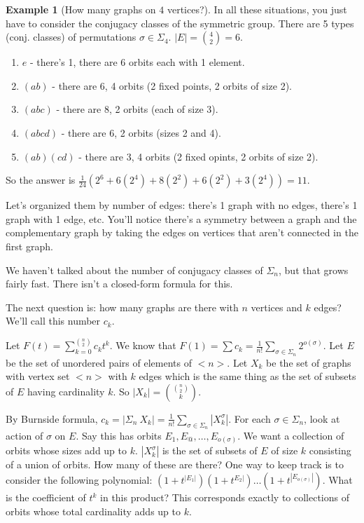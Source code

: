 \documentclass[12pt]{article}
\theoremstyle{definition}
\newtheorem{exmp}{Example}[section]
\begin{document}
\begin{exmp}[How many graphs on $4$ vertices?]
    In all these situations, you just have to consider the conjugacy classes of
    the symmetric group. There are 5 types (conj. classes) of permutations
    $\sigma \in \Sigma_4$. $|E| = {4 \choose 2} = 6$.
    \begin{enumerate}
        \item $e$ - there's 1, there are 6 orbits each with 1 element.
        \item $(ab)$ - there are 6, 4 orbits (2 fixed points, 2 orbits of size 2).
        \item $(abc)$ - there are 8, 2 orbits (each of size 3).
        \item $(abcd)$ - there are 6, 2 orbits (sizes 2 and 4).
        \item $(ab)(cd)$ - there are 3, 4 orbits (2 fixed opints, 2 orbits of size 2).
    \end{enumerate}
    So the answer is $\frac{1}{24} (2^6 + 6(2^4) + 8(2^2) + 6(2^2) + 3(2^4)) =
    11$.

    Let's organized them by number of edges: there's 1 graph with no edges,
    there's 1 graph with 1 edge, etc. You'll notice there's a symmetry between
    a graph and the complementary graph by taking the edges on vertices that
    aren't connected in the first graph. 

    We haven't talked about the number of conjugacy classes of $\Sigma_n$, but
    that grows fairly fast. There isn't a closed-form formula for this.
\end{exmp}

The next question is: how many graphs are there with $n$ vertices and $k$
edges? We'll call this number $c_k$.

Let $F(t) = \sum_{k = 0}^{n \choose 2} c_kt^k$. We know that $F(1) = \sum c_k =
\frac{1}{n!} \sum_{\sigma \in \Sigma_n} 2^{o(\sigma)}$. Let $E$ be the set of
unordered pairs of elements of $<n>$. Let $X_k$ be the set of graphs with
vertex set $<n>$ with $k$ edges which is the same thing as the set of subsets
of $E$ having cardinality $k$. So $|X_k| = {{n \choose 2} \choose k}$.

By Burnside formula, $c_k = |\Sigma_n \ X_k| = \frac{1}{n!} \sum_{\sigma \in
\Sigma_n} |X^\sigma_k|$. For each $\sigma \in \Sigma_n$, look at action of
$\sigma$ on $E$. Say this has orbits $E_1, E_@, \ldots, E_{o(\sigma)}$. We want
a collection of orbits whose sizes add up to $k$. $|X_k^\sigma|$ is the set of
subsets of $E$ of size $k$ consisting of a union of orbits. How many of these
are there? One way to keep track is to consider the following polynomial: $ (1
+ t^{|E_1|})(1 + t^{E_2|})\ldots(1 + t^{|E_{o(\sigma)}|})$. What is the
coefficient of $t^k$ in this product? This corresponds exactly to collections
of orbits whose total cardinality adds up to $k$.
\end{document}
